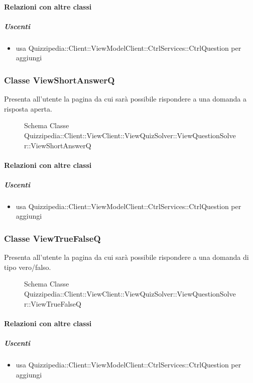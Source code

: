\paragraph{Relazioni con altre classi}
\subparagraph{Uscenti}
\begin{itemize}
\item usa Quizzipedia::Client::ViewModelClient::CtrlServices::CtrlQuestion per aggiungi
\end{itemize}
\subsubsection{Classe ViewShortAnswerQ}
Presenta all'utente la pagina da cui sarà possibile rispondere a una domanda a risposta aperta.
\begin{figure}[H]
\centering
\noindent{}
\caption[Schema Classe ViewShortAnswerQ]{Schema Classe Quizzipedia::Client::ViewClient::ViewQuizSolver::ViewQuestionSolver::ViewShortAnswerQ}
\end{figure}
\paragraph{Relazioni con altre classi}
\subparagraph{Uscenti}
\begin{itemize}
\item usa Quizzipedia::Client::ViewModelClient::CtrlServices::CtrlQuestion per aggiungi
\end{itemize}
\subsubsection{Classe ViewTrueFalseQ}
Presenta all'utente la pagina da cui sarà possibile rispondere a una domanda di tipo vero/falso.
\begin{figure}[H]
\centering
\noindent{}
\caption[Schema Classe ViewTrueFalseQ]{Schema Classe Quizzipedia::Client::ViewClient::ViewQuizSolver::ViewQuestionSolver::ViewTrueFalseQ}
\end{figure}
\paragraph{Relazioni con altre classi}
\subparagraph{Uscenti}
\begin{itemize}
\item usa Quizzipedia::Client::ViewModelClient::CtrlServices::CtrlQuestion per aggiungi
\end{itemize}
